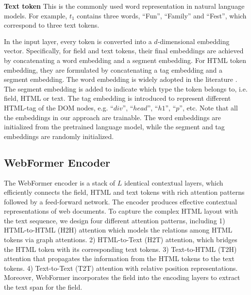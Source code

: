 \documentclass[sigconf]{acmart}
\begin{document}
\noindent\textbf{Text token} This is the commonly used word representation in natural language models. For example, $t_1$ contains three words, ``Fun'', ``Family'' and ``Fest'', which correspond to three text tokens.

In the input layer, every token is converted into a $d$-dimensional embedding vector. Specifically, for field and text tokens, their final embeddings are achieved by concatenating a word embedding and a segment embedding. For HTML token embedding, they are formulated by concatenating a tag embedding and a segment embedding.
The word embedding is widely adopted in the literature \cite{MikolovSCCD13}.
The segment embedding is added to indicate which type the token belongs to, i.e. field, HTML or text.
The tag embedding is introduced to represent different HTML-tag of the DOM nodes, e.g. ``$div$'', ``$head$'', ``$h1$'', ``$p$'', etc.
Note that all the embeddings in our approach are trainable. The word embeddings are initialized from the pretrained language model, while the segment and tag embeddings are randomly initialized.

\subsection{WebFormer Encoder}
The WebFormer encoder is a stack of $L$ identical contextual layers, which efficiently connects the field, HTML and text tokens with rich attention patterns followed by a feed-forward network. The encoder produces effective contextual representations of web documents. To capture the complex HTML layout with the text sequence, we design four different attention patterns, including 1) HTML-to-HTML (H2H) attention which models the relations among HTML tokens via graph attentions. 2) HTML-to-Text (H2T) attention, which bridges the HTML token with its corresponding text tokens. 3) Text-to-HTML (T2H) attention that propagates the information from the HTML tokens to the text tokens. 4) Text-to-Text (T2T) attention with relative position representations. Moreover, WebFormer incorporates the field into the encoding layers to extract the text span for the field.
\end{document}

